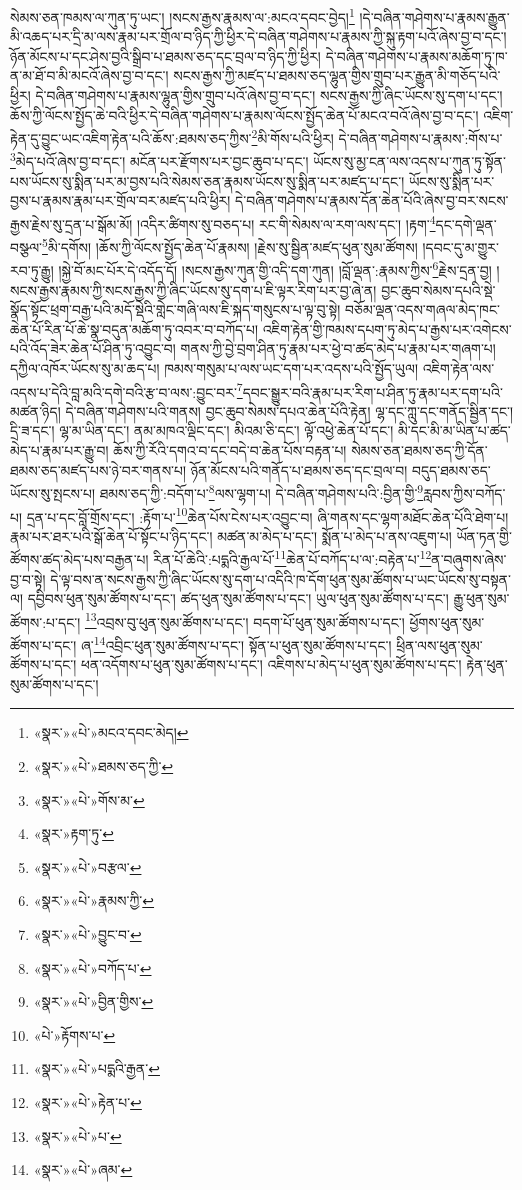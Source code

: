 སེམས་ཅན་ཁམས་ལ་ཀུན་ཏུ་ཡང་། །སངས་རྒྱས་རྣམས་ལ་:མངའ་དབང་བྱེད།\footnote{«སྣར་»«པེ་»མངའ་དབང་མེད།} །དེ་བཞིན་གཤེགས་པ་རྣམས་རྒྱུན་མི་འཆད་པར་དྲི་མ་ལས་རྣམ་པར་གྲོལ་བ་ཉིད་ཀྱི་ཕྱིར་དེ་བཞིན་གཤེགས་པ་རྣམས་ཀྱི་སྐུ་རྟག་པའོ་ཞེས་བྱ་བ་དང་། ཉོན་མོངས་པ་དང་ཤེས་བྱའི་སྒྲིབ་པ་ཐམས་ཅད་དང་བྲལ་བ་ཉིད་ཀྱི་ཕྱིར། དེ་བཞིན་གཤེགས་པ་རྣམས་མཆོག་ཏུ་ཁ་ན་མ་ཐོ་བ་མི་མངའོ་ཞེས་བྱ་བ་དང་། སངས་རྒྱས་ཀྱི་མཛད་པ་ཐམས་ཅད་ལྷུན་གྱིས་གྲུབ་པར་རྒྱུན་མི་གཅོད་པའི་ཕྱིར། དེ་བཞིན་གཤེགས་པ་རྣམས་ལྷུན་གྱིས་གྲུབ་པའོ་ཞེས་བྱ་བ་དང་། སངས་རྒྱས་ཀྱི་ཞིང་ཡོངས་སུ་དག་པ་དང་། ཆོས་ཀྱི་ལོངས་སྤྱོད་ཆེ་བའི་ཕྱིར་དེ་བཞིན་གཤེགས་པ་རྣམས་ལོངས་སྤྱོད་ཆེན་པོ་མངའ་བའོ་ཞེས་བྱ་བ་དང་། འཇིག་རྟེན་དུ་བྱུང་ཡང་འཇིག་རྟེན་པའི་ཆོས་:ཐམས་ཅད་ཀྱིས་\footnote{«སྣར་»«པེ་»ཐམས་ཅད་ཀྱི་}མི་གོས་པའི་ཕྱིར། དེ་བཞིན་གཤེགས་པ་རྣམས་:གོས་པ་\footnote{«སྣར་»«པེ་»གོས་མ་}མེད་པའོ་ཞེས་བྱ་བ་དང་། མངོན་པར་རྫོགས་པར་བྱང་ཆུབ་པ་དང་། ཡོངས་སུ་མྱ་ངན་ལས་འདས་པ་ཀུན་ཏུ་སྟོན་པས་ཡོངས་སུ་སྨིན་པར་མ་བྱས་པའི་སེམས་ཅན་རྣམས་ཡོངས་སུ་སྨིན་པར་མཛད་པ་དང་། ཡོངས་སུ་སྨིན་པར་བྱས་པ་རྣམས་རྣམ་པར་གྲོལ་བར་མཛད་པའི་ཕྱིར། དེ་བཞིན་གཤེགས་པ་རྣམས་དོན་ཆེན་པོའི་ཞེས་བྱ་བར་སངས་རྒྱས་རྗེས་སུ་དྲན་པ་སྒོམ་མོ། །འདིར་ཚིགས་སུ་བཅད་པ། རང་གི་སེམས་ལ་རག་ལས་དང་། །རྟག་\footnote{«སྣར་»རྟག་ཏུ་}དང་དགེ་ལྡན་བསྩལ་\footnote{«སྣར་»«པེ་»བརྩལ་}མི་དགོས། །ཆོས་ཀྱི་ལོངས་སྤྱོད་ཆེན་པོ་རྣམས། །རྗེས་སུ་སྦྱིན་མཛད་ཕུན་སུམ་ཚོགས། །དབང་དུ་མ་གྱུར་རབ་ཏུ་རྒྱུ། །སྐྱེ་བོ་མང་པོར་དེ་འདོད་དོ། །སངས་རྒྱས་ཀུན་གྱི་འདི་དག་ཀུན། །བློ་ལྡན་:རྣམས་ཀྱིས་\footnote{«སྣར་»«པེ་»རྣམས་ཀྱི་}རྗེས་དྲན་བྱ། །སངས་རྒྱས་རྣམས་ཀྱི་སངས་རྒྱས་ཀྱི་ཞིང་ཡོངས་སུ་དག་པ་ཇི་ལྟར་རིག་པར་བྱ་ཞེ་ན། བྱང་ཆུབ་སེམས་དཔའི་སྡེ་སྣོད་སྟོང་ཕྲག་བརྒྱ་པའི་མདོ་སྡེའི་གླེང་གཞི་ལས་ཇི་སྐད་གསུངས་པ་ལྟ་བུ་སྟེ། བཅོམ་ལྡན་འདས་གཞལ་མེད་ཁང་ཆེན་པོ་རིན་པོ་ཆེ་སྣ་བདུན་མཆོག་ཏུ་འབར་བ་བཀོད་པ། འཇིག་རྟེན་གྱི་ཁམས་དཔག་ཏུ་མེད་པ་རྒྱས་པར་འགེངས་པའི་འོད་ཟེར་ཆེན་པོ་ཤིན་ཏུ་འབྱུང་བ། གནས་ཀྱི་བྱེ་བྲག་ཤིན་ཏུ་རྣམ་པར་ཕྱེ་བ་ཚད་མེད་པ་རྣམ་པར་གཞག་པ། དཀྱིལ་འཁོར་ཡོངས་སུ་མ་ཆད་པ། ཁམས་གསུམ་པ་ལས་ཡང་དག་པར་འདས་པའི་སྤྱོད་ཡུལ། འཇིག་རྟེན་ལས་འདས་པ་དེའི་བླ་མའི་དགེ་བའི་རྩ་བ་ལས་:བྱུང་བར་\footnote{«སྣར་»«པེ་»བྱུང་བ་}དབང་སྒྱུར་བའི་རྣམ་པར་རིག་པ་ཤིན་ཏུ་རྣམ་པར་དག་པའི་མཚན་ཉིད། དེ་བཞིན་གཤེགས་པའི་གནས། བྱང་ཆུབ་སེམས་དཔའ་ཆེན་པོའི་རྟེན། ལྷ་དང་ཀླུ་དང་གནོད་སྦྱིན་དང་། དྲི་ཟ་དང་། ལྷ་མ་ཡིན་དང་། ནམ་མཁའ་ལྡིང་དང་། མིའམ་ཅི་དང་། ལྟོ་འཕྱེ་ཆེན་པོ་དང་། མི་དང་མི་མ་ཡིན་པ་ཚད་མེད་པ་རྣམ་པར་རྒྱུ་བ། ཆོས་ཀྱི་རོའི་དགའ་བ་དང་བདེ་བ་ཆེན་པོས་བརྟན་པ། སེམས་ཅན་ཐམས་ཅད་ཀྱི་དོན་ཐམས་ཅད་མཛད་པས་ཉེ་བར་གནས་པ། ཉོན་མོངས་པའི་གནོད་པ་ཐམས་ཅད་དང་བྲལ་བ། བདུད་ཐམས་ཅད་ཡོངས་སུ་སྤངས་པ། ཐམས་ཅད་ཀྱི་:བདོག་པ་\footnote{«སྣར་»«པེ་»བཀོད་པ་}ལས་ལྷག་པ། དེ་བཞིན་གཤེགས་པའི་:བྱིན་གྱི་\footnote{«སྣར་»«པེ་»བྱིན་གྱིས་}རླབས་ཀྱིས་བཀོད་པ། དྲན་པ་དང་བློ་གྲོས་དང་། :རྟོག་པ་\footnote{«པེ་»རྟོགས་པ་}ཆེན་པོས་ངེས་པར་འབྱུང་བ། ཞི་གནས་དང་ལྷག་མཐོང་ཆེན་པོའི་ཐེག་པ། རྣམ་པར་ཐར་པའི་སྒོ་ཆེན་པོ་སྟོང་པ་ཉིད་དང་། མཚན་མ་མེད་པ་དང་། སྨོན་པ་མེད་པ་ནས་འཇུག་པ། ཡོན་ཏན་གྱི་ཚོགས་ཚད་མེད་པས་བརྒྱན་པ། རིན་པོ་ཆེའི་:པདྨའི་རྒྱལ་པོ་\footnote{«སྣར་»«པེ་»པདྨའི་རྒྱན་}ཆེན་པོ་བཀོད་པ་ལ་:བརྟེན་པ་\footnote{«སྣར་»«པེ་»རྟེན་པ་}ན་བཞུགས་ཞེས་བྱ་བ་སྟེ། དེ་ལྟ་བས་ན་སངས་རྒྱས་ཀྱི་ཞིང་ཡོངས་སུ་དག་པ་འདིའི་ཁ་དོག་ཕུན་སུམ་ཚོགས་པ་ཡང་ཡོངས་སུ་བསྟན་ལ། དབྱིབས་ཕུན་སུམ་ཚོགས་པ་དང་། ཚད་ཕུན་སུམ་ཚོགས་པ་དང་། ཡུལ་ཕུན་སུམ་ཚོགས་པ་དང་། རྒྱུ་ཕུན་སུམ་ཚོགས་:པ་དང་། \footnote{«སྣར་»«པེ་»པ་}འབྲས་བུ་ཕུན་སུམ་ཚོགས་པ་དང་། བདག་པོ་ཕུན་སུམ་ཚོགས་པ་དང་། ཕྱོགས་ཕུན་སུམ་ཚོགས་པ་དང་། ཞ་\footnote{«སྣར་»«པེ་»ཞམ་}འབྲིང་ཕུན་སུམ་ཚོགས་པ་དང་། སྟོན་པ་ཕུན་སུམ་ཚོགས་པ་དང་། ཕྲིན་ལས་ཕུན་སུམ་ཚོགས་པ་དང་། ཕན་འདོགས་པ་ཕུན་སུམ་ཚོགས་པ་དང་། འཇིགས་པ་མེད་པ་ཕུན་སུམ་ཚོགས་པ་དང་། རྟེན་ཕུན་སུམ་ཚོགས་པ་དང་། 